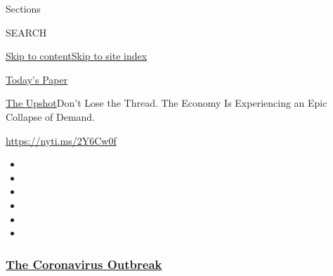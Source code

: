 Sections

SEARCH

\protect\hyperlink{site-content}{Skip to
content}\protect\hyperlink{site-index}{Skip to site index}

\href{https://myaccount.nytimes3xbfgragh.onion/auth/login?response_type=cookie\&client_id=vi}{}

\href{https://www.nytimes3xbfgragh.onion/section/todayspaper}{Today's
Paper}

\href{/section/upshot}{The Upshot}\textbar{}Don't Lose the Thread. The
Economy Is Experiencing an Epic Collapse of Demand.

\url{https://nyti.ms/2Y6Cw0f}

\begin{itemize}
\item
\item
\item
\item
\item
\item
\end{itemize}

\hypertarget{the-coronavirus-outbreak}{%
\subsubsection{\texorpdfstring{\href{https://www.nytimes3xbfgragh.onion/news-event/coronavirus?name=styln-coronavirus-national\&region=TOP_BANNER\&block=storyline_menu_recirc\&action=click\&pgtype=Article\&impression_id=7c275de0-f4c9-11ea-a65e-239a33d4e80b\&variant=undefined}{The
Coronavirus
Outbreak}}{The Coronavirus Outbreak}}\label{the-coronavirus-outbreak}}

